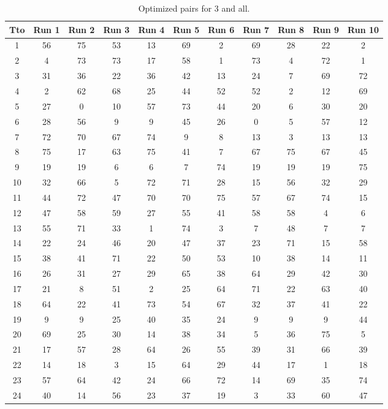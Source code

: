 \begin{table}
  \centering
  \scriptsize
  \caption{Optimized pairs for 3 and all.}
  \label{tab_pairs}
\begin{tabular}{c c c c c c c c c c c }
\hline
Tto & Run 1 & Run 2 & Run 3 & Run 4 & Run 5 & Run 6 & Run 7 & Run 8 & Run 9 & Run 10 \\
\hline
1 & 56 & 75 & 53 & 13 & 69 & 2 & 69 & 28 & 22 & 2 \\
2 & 4 & 73 & 73 & 17 & 58 & 1 & 73 & 4 & 72 & 1 \\
3 & 31 & 36 & 22 & 36 & 42 & 13 & 24 & 7 & 69 & 72 \\
4 & 2 & 62 & 68 & 25 & 44 & 52 & 52 & 2 & 12 & 69 \\
5 & 27 & 0 & 10 & 57 & 73 & 44 & 20 & 6 & 30 & 20 \\
6 & 28 & 56 & 9 & 9 & 45 & 26 & 0 & 5 & 57 & 12 \\
7 & 72 & 70 & 67 & 74 & 9 & 8 & 13 & 3 & 13 & 13 \\
8 & 75 & 17 & 63 & 75 & 41 & 7 & 67 & 75 & 67 & 45 \\
9 & 19 & 19 & 6 & 6 & 7 & 74 & 19 & 19 & 19 & 75 \\
10 & 32 & 66 & 5 & 72 & 71 & 28 & 15 & 56 & 32 & 29 \\
11 & 44 & 72 & 47 & 70 & 70 & 75 & 57 & 67 & 74 & 15 \\
12 & 47 & 58 & 59 & 27 & 55 & 41 & 58 & 58 & 4 & 6 \\
13 & 55 & 71 & 33 & 1 & 74 & 3 & 7 & 48 & 7 & 7 \\
14 & 22 & 24 & 46 & 20 & 47 & 37 & 23 & 71 & 15 & 58 \\
15 & 38 & 41 & 71 & 22 & 50 & 53 & 10 & 38 & 14 & 11 \\
16 & 26 & 31 & 27 & 29 & 65 & 38 & 64 & 29 & 42 & 30 \\
17 & 21 & 8 & 51 & 2 & 25 & 64 & 71 & 22 & 63 & 40 \\
18 & 64 & 22 & 41 & 73 & 54 & 67 & 32 & 37 & 41 & 22 \\
19 & 9 & 9 & 25 & 40 & 35 & 24 & 9 & 9 & 9 & 44 \\
20 & 69 & 25 & 30 & 14 & 38 & 34 & 5 & 36 & 75 & 5 \\
21 & 17 & 57 & 28 & 64 & 26 & 55 & 39 & 31 & 66 & 39 \\
22 & 14 & 18 & 3 & 15 & 64 & 29 & 44 & 17 & 1 & 18 \\
23 & 57 & 64 & 42 & 24 & 66 & 72 & 14 & 69 & 35 & 74 \\
24 & 40 & 14 & 56 & 23 & 37 & 19 & 3 & 33 & 60 & 47 \\

\end{tabular}
\end{table}

